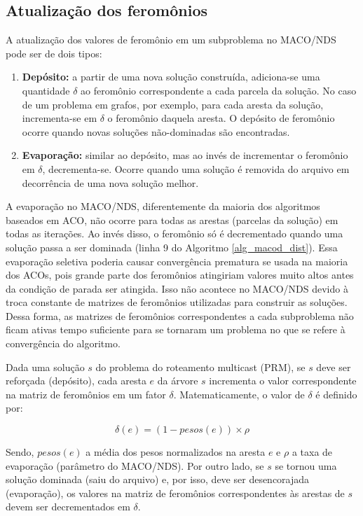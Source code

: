 \subsection{Atualização dos feromônios}
\label{section_macod_pheromones}

A atualização dos valores de feromônio em um subproblema no MACO/NDS pode ser de dois tipos:

\begin{enumerate}
	\item \textbf{Depósito:} a partir de uma nova solução construída, adiciona-se uma quantidade $\delta$ ao feromônio correspondente a cada parcela da solução. No caso de um problema em grafos, por exemplo, para cada aresta da solução, incrementa-se em $\delta$ o feromônio daquela aresta. O depósito de feromônio ocorre quando novas soluções não-dominadas são encontradas.
	\item \textbf{Evaporação:} similar ao depósito, mas ao invés de incrementar o feromônio em $\delta$, decrementa-se. Ocorre quando uma solução é removida do arquivo em decorrência de uma nova solução melhor.
\end{enumerate}

A evaporação no MACO/NDS, diferentemente da maioria dos algoritmos baseados em ACO, não ocorre para todas as arestas (parcelas da solução) em todas as iterações. Ao invés disso, o feromônio só é decrementado quando uma solução passa a ser dominada (linha 9 do Algoritmo \ref{alg_macod_dist}). Essa evaporação seletiva poderia causar convergência prematura se usada na maioria dos ACOs, pois grande parte dos feromônios atingiriam valores muito altos antes da condição de parada ser atingida. Isso não acontece no MACO/NDS devido à troca constante de matrizes de feromônios utilizadas para construir as soluções. Dessa forma, as matrizes de feromônios correspondentes a cada subproblema não ficam ativas tempo suficiente para se tornaram um problema no que se refere à convergência do algoritmo.

Dada uma solução $s$ do problema do roteamento multicast (PRM), se $s$ deve ser reforçada (depósito), cada aresta $e$ da árvore $s$ incrementa o valor correspondente na matriz de feromônios em um fator $\delta$. Matematicamente, o valor de $\delta$ é definido por:

\begin{equation}\delta(e) = (1 - pesos(e)) \times \rho\end{equation}

Sendo, $pesos(e)$ a média dos pesos normalizados na aresta $e$ e $\rho$ a taxa de evaporação (parâmetro do MACO/NDS). Por outro lado, se $s$ se tornou uma solução dominada (saiu do arquivo) e, por isso, deve ser desencorajada (evaporação), os valores na matriz de feromônios correspondentes às arestas de $s$ devem ser decrementados em $\delta$.

